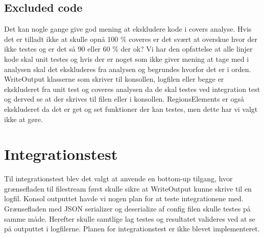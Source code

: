 \subsection{Excluded code}
Det kan nogle gange give god mening at ekskludere kode i covers analyse. Hvis det er tilladt ikke at skulle opnå 100 \% coveres er det svært at overskue hvor der ikke testes og er det så 90 eller 60 \% der ok? Vi har den opfattelse at alle linjer kode skal unit testes og hvis der er noget som ikke giver mening at tage med i analysen skal det ekskluderes fra analysen og begrundes hvorfor det er i orden.
WriteOutput klasserne som skriver til konsollen, logfilen eller begge er ekskluderet fra unit test og coveres analysen da de skal testes ved integration test og derved se at der skrives til filen eller i konsollen. 
RegionsElements er også ekskluderet da det er get og set funktioner der kan testes, men dette har vi valgt ikke at gøre.

\section{Integrationstest}
Til integrationstest blev det valgt at anvende en bottom-up tilgang, hvor grænsefladen til filestream først skulle sikre at WriteOutput kunne skrive til en logfil. Konsol outputtet havde vi nogen plan for at teste integrationene med. Grænsefladen med JSON serializer og deserialize af config filen skulle testes på samme måde. Herefter skulle samtlige lag testes og resultatet valideres ved at se på outputtet i logfilerne. Planen for integrationstest er ikke blevet implementeret.


